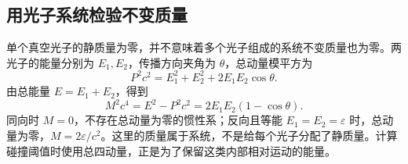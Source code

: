 \subsection{用光子系统检验不变质量}
单个真空光子的静质量为零，并不意味着多个光子组成的系统不变质量也为零。两光子的能量分别为 $E_1,E_2$，传播方向夹角为 $\theta$，总动量模平方为
\[
 P^2c^2=E_1^2+E_2^2+2E_1E_2\cos\theta.
\]
由总能量 $E=E_1+E_2$，得到
\[
 M^2c^4=E^2-P^2c^2=2E_1E_2(1-\cos\theta).
\]
同向时 $M=0$，不存在总动量为零的惯性系；反向且等能 $E_1=E_2=\varepsilon$ 时，总动量为零，$M=2\varepsilon/c^2$。这里的质量属于系统，不是给每个光子分配了静质量。计算碰撞阈值时使用总四动量，正是为了保留这类内部相对运动的能量。


\hypersetup{bookmarksdepth=2}
\endgroup
